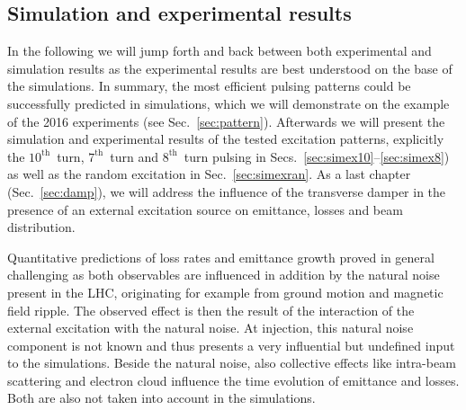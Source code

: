\documentclass[%
 reprint,
 amsmath,amssymb,
 aps,
prstab,
]{revtex4-1}
\begin{document}
\subsection{Simulation and experimental results\label{sec:simex}}
In the following we will jump forth and back between both experimental and simulation results as the experimental results are best understood on the base of the simulations. In summary, the most efficient pulsing patterns could be successfully predicted in simulations, which we will demonstrate on the example of the 2016 experiments (see Sec.~\ref{sec:pattern}). Afterwards we will present the simulation and experimental results of the tested excitation patterns, explicitly the $10^{\mathrm{th}}$~turn, $7^{\mathrm{th}}$~turn and $8^{\mathrm{th}}$~turn pulsing in Secs.~\ref{sec:simex10}--\ref{sec:simex8}) as well as the random excitation in Sec.~\ref{sec:simexran}. As a last chapter (Sec.~\ref{sec:damp}), we will address the influence of the transverse damper in the presence of an external excitation source on emittance, losses and beam distribution.

Quantitative predictions of loss rates and emittance growth proved in general challenging as both observables are influenced in addition by the natural noise present in the LHC, originating for example from ground motion and magnetic field ripple. The observed effect is then the result of the interaction of the external excitation with the natural noise. At injection, this natural noise component is not known and thus presents a very influential but undefined input to the simulations. Beside the natural noise, also collective effects like intra-beam scattering and electron cloud influence the time evolution of emittance and losses. Both are also not taken into account in the simulations.
\end{document}

